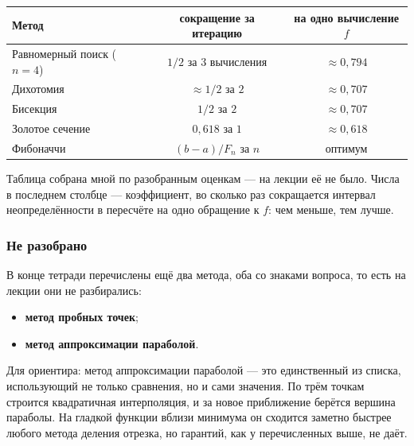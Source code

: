 \begin{center}
\begin{tabular}{lcc}
\toprule
Метод & сокращение за итерацию & на одно вычисление $f$ \\
\midrule
Равномерный поиск ($n=4$) & $1/2$ за $3$ вычисления & $\approx 0{,}794$ \\
Дихотомия                 & $\approx 1/2$ за $2$    & $\approx 0{,}707$ \\
Бисекция                  & $1/2$ за $2$            & $\approx 0{,}707$ \\
Золотое сечение           & $0{,}618$ за $1$        & $\approx 0{,}618$ \\
Фибоначчи                 & $(b-a)/F_n$ за $n$      & оптимум \\
\bottomrule
\end{tabular}
\end{center}

\begin{idea}[title={О сводной таблице}]
Таблица собрана мной по разобранным оценкам — на лекции её не было. Числа в
последнем столбце — коэффициент, во сколько раз сокращается интервал
неопределённости в пересчёте на одно обращение к $f$: чем меньше, тем лучше.
\end{idea}

\subsubsection*{Не разобрано}

\begin{idea}[title={Не разобрано на лекции}]
В конце тетради перечислены ещё два метода, оба со знаками вопроса, то есть на
лекции они не разбирались:
\begin{itemize}[leftmargin=1.6em, topsep=2pt]
  \item \textbf{метод пробных точек};
  \item \textbf{метод аппроксимации параболой}.
\end{itemize}
\end{idea}

\begin{idea}
Для ориентира: метод аппроксимации параболой — это единственный из списка,
использующий не только сравнения, но и сами значения. По трём точкам строится
квадратичная интерполяция, и за новое приближение берётся вершина параболы.
На гладкой функции вблизи минимума он сходится заметно быстрее любого метода
деления отрезка, но гарантий, как у перечисленных выше, не даёт.
\end{idea}
